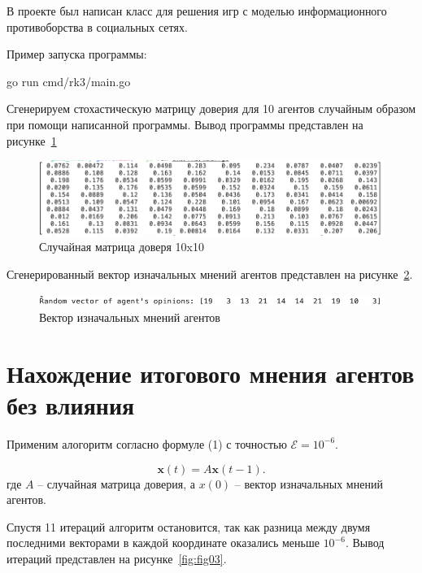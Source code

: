 
В проекте был написан класс для решения игр с моделью информационного противоборства в социальных сетях.

Пример запуска программы:

\begin{codelisting}[language=Bash]
    go run cmd/rk3/main.go
\end{codelisting}

Сгенерируем стохастическую матрицу доверия для 10 агентов
случайным образом при помощи написанной программы. Вывод программы представлен на рисунке~\ref{fig:fig01}

\begin{figure}
  \centering
  \includegraphics[scale=0.5]{../../artifacts/rk3/1.png}
  \caption{Случайная матрица доверя 10x10}
  \label{fig:fig01}
\end{figure}

Сгенерированный вектор изначальных мнений агентов представлен на рисунке~\ref{fig:fig02}.

\begin{figure}
  \centering
  \includegraphics[scale=0.6]{../../artifacts/rk3/2.png}
  \caption{Вектор изначальных мнений агентов}
  \label{fig:fig02}
\end{figure}

\section{Нахождение итогового мнения агентов без влияния}

Применим алогоритм согласно формуле (1) с точностью $\mathcal E = 10^{-6}$.

\begin{equation}
\mathbf{x}(t) = A \mathbf{x}(t - 1).
\end{equation}
где $A$ -- случайная матрица доверия, а $x(0)$ -- вектор изначальных мнений агентов.

Спустя 11 итераций алгоритм остановится, так как разница между двумя последними векторами в каждой
координате оказались меньше $10^{-6}$. Вывод итераций представлен на рисунке~\ref{fig:fig03}.

